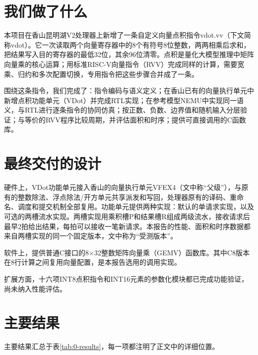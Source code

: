 \renewcommand{\stagefigureprefix}{0}\setcounter{figure}{0}

\section*{我们做了什么}
本项目在香山昆明湖V2处理器上新增了一条自定义向量点积指令vdot.vv（下文简称vdot）。它一次读取两个向量寄存器中的8个有符号8位整数，两两相乘后求和，把结果写入目的寄存器的最低32位，其余96位清零。点积是量化大模型推理中矩阵向量乘的核心运算；用标准RISC-V向量指令（RVV）完成同样的计算，需要宽乘、归约和多次配置切换，专用指令把这些步骤合并成了一条。

围绕这条指令，我们完成了：指令编码与语义定义；在香山已有的向量执行单元中新增点积功能单元（VDot）并完成RTL实现；在参考模型NEMU中实现同一语义，与RTL进行逐条指令的协同仿真；按正数、负数、边界值和随机输入分层验证；与等价的RVV程序比较周期，并评估面积和时序；提供可直接调用的C函数库。

\section*{最终交付的设计}
硬件上，VDot功能单元接入香山的向量执行单元VFEX4（文中称“父级”），与原有的整数除法、浮点除法/开方单元共享派发和写回，处理器原有的译码、重命名、调度和提交机制全部复用。功能单元提供两种实现：默认的单请求实现，以及可选的两槽流水实现。两槽实现用乘积槽P和结果槽R组成两级流水，接收请求后最早2拍给出结果，每拍可以接收一笔新请求。本报告的性能、面积和时序数据都来自两槽实现的同一个固定版本，文中称为“受测版本”。

软件上，提供普通C接口的8×32整数矩阵向量乘（GEMV）函数库。其中C8版本在8行计算之间复用向量配置，是本报告选用的调用实现。

扩展方面，十六项INT8点积指令和INT16元素的参数化模块都已完成功能验证，尚未纳入性能评估。

\section*{主要结果}
主要结果汇总于表\ref{tab:0-results}，每一项都注明了正文中的详细位置。

